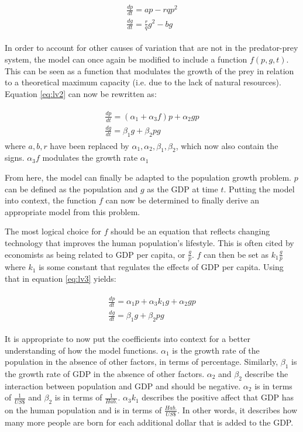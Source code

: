 \documentclass[a4paper]{article}
\begin{document}
\begin{align}
\begin{split}
\label{eq:lv2}
	\frac{dp}{dt} = ap - rqp^2\\
	\frac{dg}{dt} = \frac{r}{q}g^2- bg
\end{split}
\end{align}

In order to account for other causes of variation that are not in the predator-prey system, the model can once again be modified to include a function $f(p, g, t)$. This can be seen as a function that modulates the growth of the prey in relation to a theoretical maximum capacity (i.e. due to the lack of natural resources). Equation \ref{eq:lv2} can now be rewritten as:

\begin{align}
\begin{split}
\label{eq:lv3}
	\frac{dp}{dt} = (\alpha_1 + \alpha_3 f)p + \alpha_2 g p \\
	\frac{dg}{dt} = \beta_1 g + \beta_2 p g
\end{split}
\end{align}
where $a, b, r$ have been replaced by $\alpha_1, \alpha_2, \beta_1, \beta_2$, which now also contain the signs. $\alpha_3f$ modulates the growth rate $\alpha_1$

From here, the model can finally be adapted to the population growth problem. $p$ can be defined as the population and $g$ as the GDP at time $t$. Putting the model into context, the function $f$ can now be determined to finally derive an appropriate model from this problem.

The most logical choice for $f$ should be an equation that reflects changing technology that improves the human population's lifestyle. This is often cited by economists as being related to GDP per capita, or $\frac{g}{p}$. $f$ can then be set as $k_1 \frac{g}{p}$ where $k_1$ is some constant that regulates the effects of GDP per capita. Using that in equation \ref{eq:lv3} yields:

\begin{align}
\begin{split}
\label{eq:lvfin}
	\frac{dp}{dt} = \alpha_1 p + \alpha_3 k_1 g + \alpha_2 g p \\
	\frac{dg}{dt} = \beta_1 g + \beta_2 p g
\end{split}
\end{align}

It is appropriate to now put the coefficients into context for a better understanding of how the model functions. $\alpha_1$ is the growth rate of the population in the absence of other factors, in terms of percentage. Similarly, $\beta_1$ is the growth rate of GDP in the absence of other factors. $\alpha_2$ and $\beta_2$ describe the interaction between population and GDP and should be negative. $\alpha_2$ is in terms of $\frac{1}{US\$}$ and $\beta_2$ is in terms of $\frac{1}{Hab.}$. $\alpha_3 k_1$ describes the positive affect that GDP has on the human population and is in terms of $\frac{Hab.}{US\$}$. In other words, it describes how many more people are born for each additional dollar that is added to the GDP. 
\end{document}
